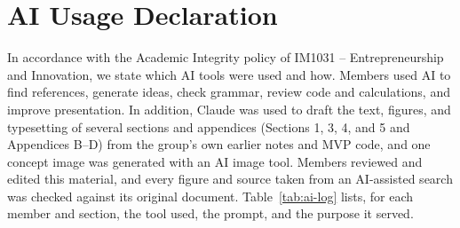 \section{AI Usage Declaration}\label{app:ai}

In accordance with the Academic Integrity policy of IM1031 -- Entrepreneurship and
Innovation, we state which AI tools were used and how. Members used AI to find references,
generate ideas, check grammar, review code and calculations, and improve presentation. In
addition, Claude was used to draft the text, figures, and typesetting of several sections and
appendices (Sections 1, 3, 4, and 5 and Appendices B--D) from the group's own earlier notes and
MVP code, and one concept image was generated with an AI image tool. Members reviewed and edited
this material, and every figure and source taken from an AI-assisted search was checked against
its original document.
Table~\ref{tab:ai-log} lists, for each member and section, the tool used, the
prompt, and the purpose it served.


